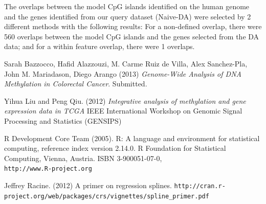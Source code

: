 \documentclass[a4paper,10pt]{article}\usepackage[]{graphicx}\usepackage[]{color}
\begin{document}
The overlaps between the model CpG islands identified on the human genome and the genes identified from our query dataset (Naive-DA) were selected by 2 different methods with the following results:
For a non-defined overlap, there were 560 overlaps between the model CpG islands and the genes selected from the DA data; and for a within feature overlap, there were 1 overlaps.   

\clearpage
\begin{thebibliography}{9}


 Sarah Bazzocco, Hafid Alazzouzi, M. Carme Ruiz de Villa, Alex Sanchez-Pla, John M. Mariadason, Diego Arango (2013) \emph{Genome-Wide Analysis of DNA Methylation in Colorectal Cancer}. Submitted.

 Yihua Liu and Peng Qiu. (2012) \emph{Integrative analysis of methylation and gene expression data in TCGA} IEEE International Workshop on Genomic Signal Processing and Statistics (GENSIPS)

 R Development Core Team (2005). R: A language and environment for statistical computing,  reference index version 2.14.0. R Foundation for Statistical Computing, Vienna, Austria. ISBN 3-900051-07-0, \\
  \verb|http://www.R-project.org|

 Jeffrey Racine. (2012) A primer on regression splines.\newline
\verb|http://cran.r-project.org/web/packages/crs/vignettes/spline_primer.pdf|

\end{thebibliography}
\end{document}
